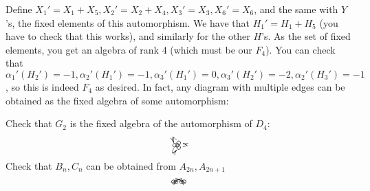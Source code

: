  Define $X_1'=X_1+X_5, X_2' = X_2+X_4, X_3' = X_3, X_6'=X_6$, and the same with $Y$'s,
 the fixed elements of this automorphism. We
 have that $H_1'=H_1+H_5$ (you have to check that this works), and similarly for the
 other $H$'s. As the set of fixed elements, you get an algebra of rank 4 (which must
 be our $F_4$). You can check that
 $\alpha_1'(H_2')=-1,\alpha_2'(H_1')=-1,\alpha_3'(H_1')=0,\alpha_3'(H_2')=-2,\alpha_2'(H_3')=-1$,
 so this is indeed $F_4$ as desired. In fact, any diagram with multiple edges can be
 obtained as the fixed algebra of some automorphism:
 \begin{exercise}
   Check that $G_2$ is the fixed algebra of the automorphism of $D_4$:
   \[\begin{xy}
     (0,0) *\cir<2pt>{};
     a(60)="1" *\cir<2pt>{} **@{-},
     a(180)="2" *\cir<2pt>{} **@{-},
     a(-60)="3" *\cir<2pt>{} **@{-},
     \ar@/_2ex/ "1" *+{\ };"2" *+{\ }
     \ar@/_2ex/ "2" *+{\ };"3" *+{\ }
     \ar@/_2ex/ "3" *+{\ };"1" *+{\ }
   \end{xy}\]
   Check that $B_n,C_n$ can be obtained from $A_{2n}, A_{2n+1}$
   \[\begin{xy}
     (0,0)="1" *\cir<2pt>{};
     (1,0)="2"  *\cir<2pt>{} **@{-};
     p+(.6,0) **@{-};
     p+(.8,0) **{\,.\,};
     p+(.6,0)="22" *\cir<2pt>{} **@{-};
     p+(1,0)="11" *\cir<2pt>{} **@{-};
     "1" *+{\ };"11" *+{\ } **\crv{(2,1.5)} ?<*@{<} ?>*@{>},
     "2" *+{\ };"22" *+{\ } **\crv{(2,1)} ?<*@{<} ?>*@{>},
   \end{xy}\]
 \end{exercise}
